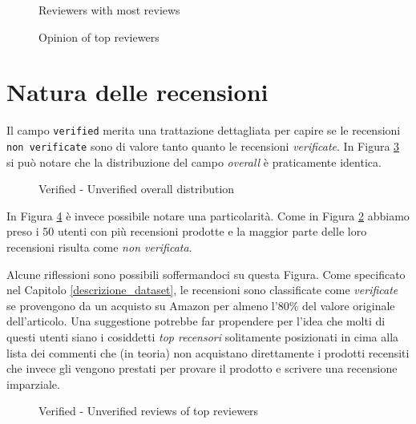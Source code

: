 \begin{figure}[H]
  \centering
  
  \caption{Reviewers with most reviews}
  \label{reviewers_most_reviews}
\end{figure}

\begin{figure}[H]
  \centering
  
  \caption{Opinion of top reviewers}
  \label{opinion_top_reviewers}
\end{figure}

\section{Natura delle recensioni}
Il campo \texttt{verified} merita una trattazione dettagliata per capire se le recensioni \texttt{non verificate} sono di valore tanto quanto le recensioni \textit{verificate}. In Figura \ref{ver_unver_overall} si può notare che la distribuzione del campo \textit{overall} è praticamente identica.

\begin{figure}[H]
    \centering
    \caption{Verified - Unverified overall distribution}
    \label{ver_unver_overall}
\end{figure}

In Figura \ref{ver_unver_toprev} è invece possibile notare una particolarità. Come in Figura \ref{opinion_top_reviewers} abbiamo preso i 50 utenti con più recensioni prodotte e la maggior parte delle loro recensioni risulta come \textit{non verificata}.
\par
Alcune riflessioni sono possibili soffermandoci su questa Figura. Come specificato nel Capitolo \ref{descrizione_dataset}, le recensioni sono classificate come \textit{verificate} se provengono da un acquisto su Amazon per almeno l'80\% del valore originale dell'articolo. Una suggestione potrebbe far propendere per l'idea che molti di questi utenti siano i cosiddetti \textit{top recensori} solitamente posizionati in cima alla lista dei commenti che (in teoria) non acquistano direttamente i prodotti recensiti che invece gli vengono prestati per provare il prodotto e scrivere una recensione imparziale.

\begin{figure}[H]
  \centering
  
  \caption{Verified - Unverified reviews of top reviewers}
  \label{ver_unver_toprev}
\end{figure}

